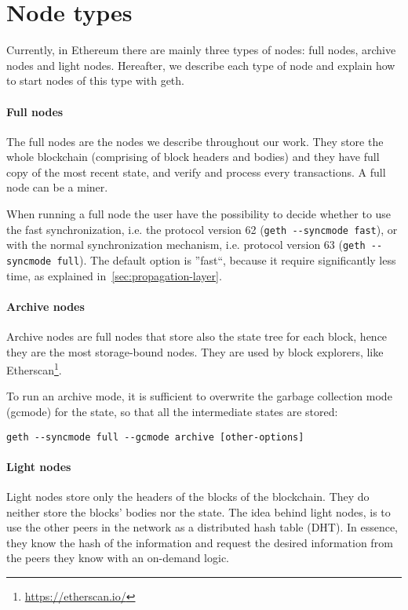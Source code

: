 \section{Node types}
\label{sec:node-types}
Currently, in Ethereum there are mainly three types of nodes: full nodes,
archive nodes and light nodes. Hereafter, we describe each type of node and
explain how to start nodes of this type with geth.

\paragraph{Full nodes}
The full nodes are the nodes we describe throughout our work. They store the
whole blockchain (comprising of block headers and bodies) and they have full
copy of the most recent state, and verify and process every transactions. A full
node can be a miner.

When running a full node the user have the possibility to decide whether to use
the fast synchronization, i.e. the protocol version 62 
(\verb|geth --syncmode fast|), or with the normal synchronization mechanism, 
i.e. protocol version 63 (\verb|geth --syncmode full|). The default option is 
''fast``, because it require significantly less time, as explained
in~\autoref{sec:propagation-layer}.

\paragraph{Archive nodes}
Archive nodes are full nodes that store also the state tree for each block,
hence they are the most storage-bound nodes. They are used by block explorers,
like Etherscan\footnote{\url{https://etherscan.io/}}.

To run an archive mode, it is sufficient to overwrite the garbage collection
mode (gcmode) for the state, so that all the intermediate states are stored:
\begin{center}
\verb|geth --syncmode full --gcmode archive [other-options]|
\end{center}
\paragraph{Light nodes}
Light nodes store only the headers of the blocks of the blockchain. They do
neither store the blocks' bodies nor the state. The idea behind light nodes, is
to use the other peers in the network as a distributed hash table (DHT).
In essence, they know the hash of the information and request the desired
information from the peers they know with an on-demand logic.

